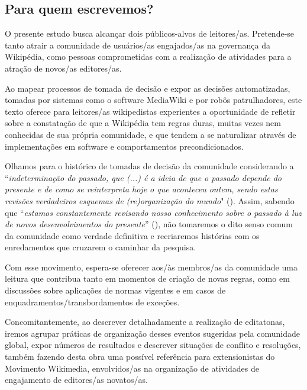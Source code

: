 \subsection{Para quem escrevemos?}

O presente estudo busca alcançar dois públicos-alvos de leitores/as. Pretende-se tanto atrair a comunidade de usuários/as engajados/as na governança da Wikipédia, como pessoas comprometidas com a realização de atividades para a atração de novos/as editores/as.

Ao mapear processos de tomada de decisão e expor as decisões automatizadas, tomadas por sistemas como o software MediaWiki e por robôs patrulhadores, este texto oferece para leitores/as wikipedistas experientes a oportunidade de refletir sobre a constatação de que a Wikipédia tem regras duras, muitas vezes nem conhecidas de sua própria comunidade, e que tendem a se naturalizar através de implementações em software e comportamentos precondicionados.

Olhamos para o histórico de tomadas de decisão da comunidade considerando a “\textit{indeterminação do passado, que (...) é a ideia de que o passado depende do presente e de como se reinterpreta hoje o que aconteceu ontem, sendo estas revisões verdadeiros esquemas de (re)organização do mundo}" (\cite[p.23]{feitosa_cidadao_2010}). Assim, sabendo que “\textit{estamos constantemente revisando nosso conhecimento sobre o passado à luz de novos desenvolvimentos do presente}” (\cite[40]{bowker_sorting_2007}), não tomaremos o dito senso comum da comunidade como verdade definitiva e recriaremos histórias com os enredamentos que cruzarem o caminhar da pesquisa.

Com esse movimento, espera-se oferecer aos/às membros/as da comunidade uma leitura que contribua tanto em momentos de criação de novas regras, como em discussões sobre aplicações de normas vigentes e em casos de enquadramentos/transbordamentos de exceções.

Concomitantemente, ao descrever detalhadamente a realização de editatonas, iremos agrupar práticas de organização desses eventos sugeridas pela comunidade global, expor números de resultados e descrever situações de conflito e resoluções, também fazendo desta obra uma possível referência para extensionistas do Movimento Wikimedia, envolvidos/as na organização de atividades de engajamento de editores/as novatos/as.

